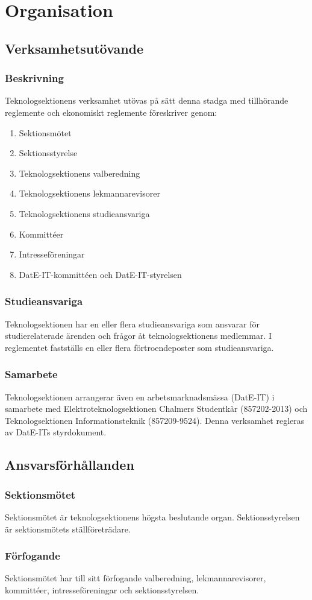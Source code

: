 \section{Organisation}
\subsection{Verksamhetsutövande}
\subsubsection{Beskrivning}
Teknologsektionens verksamhet utövas på sätt denna stadga med tillhörande reglemente och ekonomiskt reglemente föreskriver genom:
\begin{enumerate}
\item Sektionsmötet
\item Sektionsstyrelse
\item Teknologsektionens valberedning
\item Teknologsektionens lekmannarevisorer
\item Teknologsektionens studieansvariga
\item Kommittéer
\item Intresseföreningar
\item DatE-IT-kommittéen och DatE-IT-styrelsen
\end{enumerate}

\subsubsection{Studieansvariga}
Teknologsektionen har en eller flera studieansvariga som ansvarar för studierelaterade ärenden och frågor åt teknologsektionens medlemmar.
I reglementet fastställs en eller flera förtroendeposter som studieansvariga.

\subsubsection{Samarbete}
Teknologsektionen arrangerar även en arbetsmarknadsmässa (DatE-IT) i samarbete med Elektroteknologsektionen Chalmers Studentkår (857202-2013) och Teknologsektionen Informationsteknik (857209-9524). Denna verksamhet regleras av DatE-ITs styrdokument. 
  
\subsection{Ansvarsförhållanden}
\subsubsection{Sektionsmötet}
Sektionsmötet är teknologsektionens högsta beslutande organ. Sektionsstyrelsen är sektionsmötets ställföreträdare.
\subsubsection{Förfogande}
Sektionsmötet har till sitt förfogande valberedning, lekmannarevisorer, kommittéer, intresseföreningar och sektionsstyrelsen.
